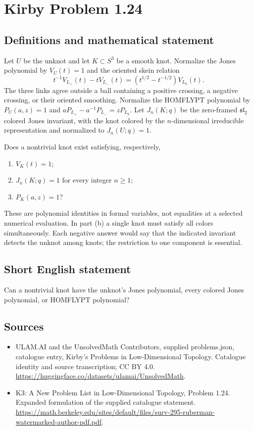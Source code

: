 \documentclass[11pt,a4paper]{article}
\begin{document}
\section*{Kirby Problem 1.24}\label{statement}

\subsection{Definitions and mathematical statement}
Let $U$ be the unknot and let $K\subset S^3$ be a smooth knot. Normalize the Jones
polynomial by $V_U(t)=1$ and the oriented skein relation
\[
t^{-1}V_{L_+}(t)-tV_{L_-}(t)
=(t^{1/2}-t^{-1/2})V_{L_0}(t).
\]
The three links agree outside a ball containing a positive crossing, a negative
crossing, or their oriented smoothing. Normalize the HOMFLYPT polynomial by
$P_U(a,z)=1$ and $aP_{L_+}-a^{-1}P_{L_-}=zP_{L_0}$.
Let $J_n(K;q)$ be the zero-framed $\mathfrak{sl}_2$ colored Jones invariant,
with the knot colored by the $n$-dimensional irreducible representation and
normalized to $J_n(U;q)=1$.

Does a nontrivial knot exist satisfying, respectively,
\begin{enumerate}
\item $V_K(t)=1$;
\item $J_n(K;q)=1$ for every integer $n\geq1$;
\item $P_K(a,z)=1$?
\end{enumerate}
These are polynomial identities in formal variables, not equalities at a selected
numerical evaluation. In part (b) a single knot must satisfy all colors
simultaneously. Each negative answer would say that the indicated invariant
detects the unknot among knots; the restriction to one component is essential.
\subsection{Short English statement}
Can a nontrivial knot have the unknot's Jones polynomial, every colored Jones polynomial, or HOMFLYPT polynomial?
\subsection{Sources}
\begin{itemize}
\item[S1] ULAM.AI and the UnsolvedMath Contributors, supplied problems.json, catalogue entry, Kirby's Problems in Low-Dimensional Topology. Catalogue identity and source transcription; CC BY 4.0.
\url{https://huggingface.co/datasets/ulamai/UnsolvedMath}.
\item[S2] K3: A New Problem List in Low-Dimensional Topology, Problem 1.24. Expanded formulation of the supplied catalogue statement.
\url{https://math.berkeley.edu/sites/default/files/surv-295-ruberman-watermarked-author-pdf.pdf}.
\end{itemize}
\end{document}
